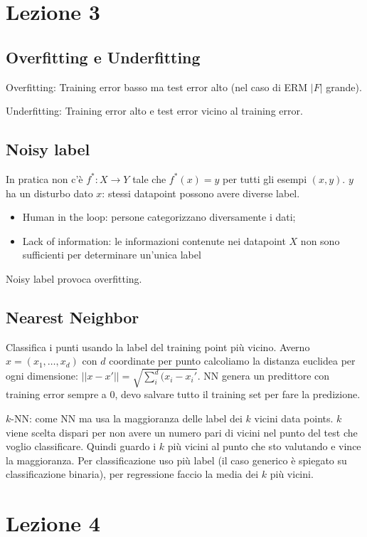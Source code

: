 \documentclass{article}
\begin{document}
\section{Lezione 3}
\subsection{Overfitting e Underfitting}
Overfitting: Training error basso ma test error alto (nel caso di ERM $|F|$ grande).



Underfitting: Training error alto e test error vicino al training error.
\subsection{Noisy label}
In pratica non c'è $f^*:X \rightarrow Y$ tale che $f^*(x)=y$ per tutti gli esempi $(x,y)$. $y$ ha un disturbo dato $x$: stessi datapoint possono avere diverse label.
\begin{itemize}
	\item Human in the loop: persone categorizzano diversamente i dati;
	\item Lack of information: le informazioni contenute nei datapoint $X$ non sono sufficienti per determinare un'unica label
\end{itemize}
Noisy label provoca overfitting.
\subsection{Nearest Neighbor}
Classifica i punti usando la label del training point più vicino.
Averno $x=(x_1, \dots, x_d)$ con $d$ coordinate per punto calcoliamo la distanza euclidea per ogni dimensione: $||x-x'||=\sqrt{\sum\limits_i^d (x_i-x_i'}$. NN genera un predittore con training error sempre a 0, devo salvare tutto il training set per fare la predizione. 



$k$-NN: come NN ma usa la maggioranza delle label dei $k$ vicini data points. $k$ viene scelta dispari per non avere un numero pari di vicini nel punto del test che voglio classificare. Quindi guardo i $k$ più vicini al punto che sto valutando e vince la maggioranza. Per classificazione uso più label (il caso generico è spiegato su classificazione binaria), per regressione faccio la media dei $k$ più vicini.

\section{Lezione 4}
\end{document}
